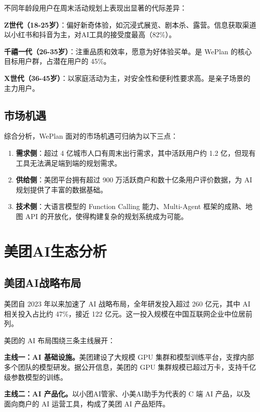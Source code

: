 \documentclass[12pt,a4paper]{ctexart}
\begin{document}
不同年龄段用户在周末活动规划上表现出显著的代际差异：

\textbf{Z世代（18-25岁）}：偏好新奇体验，如沉浸式展览、剧本杀、露营。信息获取渠道以小红书和抖音为主，对AI工具的接受度最高（82\%）。

\textbf{千禧一代（26-35岁）}：注重品质和效率，愿意为好体验买单。是 WePlan 的核心目标用户群，占潜在用户的 45\%。

\textbf{X世代（36-45岁）}：以家庭活动为主，对安全性和便利性要求高。是亲子场景的主力用户。

\subsection{市场机遇}

综合分析，WePlan 面对的市场机遇可归纳为以下三点：

\begin{enumerate}[leftmargin=2em]
  \item \textbf{需求侧}：超过 4 亿城市人口有周末出行需求，其中活跃用户约 1.2 亿，但现有工具无法满足端到端的规划需求。
  \item \textbf{供给侧}：美团平台拥有超过 900 万活跃商户和数十亿条用户评价数据，为 AI 规划提供了丰富的数据基础。
  \item \textbf{技术侧}：大语言模型的 Function Calling 能力、Multi-Agent 框架的成熟、地图 API 的开放化，使得构建复杂的规划系统成为可能。
\end{enumerate}

\newpage

\section{美团AI生态分析}

\subsection{美团AI战略布局}

美团自 2023 年以来加速了 AI 战略布局，全年研发投入超过 260 亿元，其中 AI 相关投入占比约 47\%，接近 122 亿元。这一投入规模在中国互联网企业中位居前列。

美团的 AI 布局围绕三条主线展开：

\textbf{主线一：AI 基础设施。}美团建设了大规模 GPU 集群和模型训练平台，支撑内部多个团队的模型研发。据公开信息，美团的 GPU 集群规模已超过万卡，支持千亿级参数模型的训练。

\textbf{主线二：AI 产品化。}以小团AI管家、小美AI助手为代表的 C 端 AI 产品，以及面向商户的 AI 运营工具，构成了美团 AI 产品矩阵。
\end{document}
